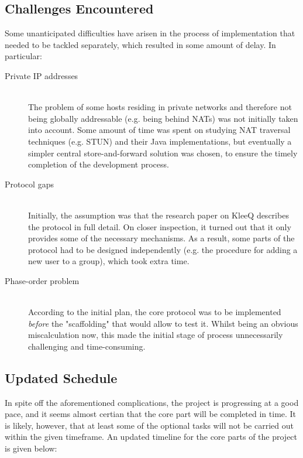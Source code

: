 \documentclass[12pt, a4paper]{article}
\begin{document}
\subsection{Challenges Encountered}
Some unanticipated difficulties have arisen in the process of implementation that needed to be tackled separately, which resulted in some amount of delay. In particular:
\begin{description}
    \item[Private IP addresses] \hfill \\
        The problem of some hosts residing in private networks and therefore not being globally addressable (e.g. being behind NATs) was not initially taken into account. Some amount of time was spent on studying NAT traversal techniques (e.g. STUN) and their Java implementations, but eventually a simpler central store-and-forward solution was chosen, to ensure the timely completion of the development process.
    \item[Protocol gaps] \hfill \\
        Initially, the assumption was that the research paper on KleeQ \cite{kleeq} describes the protocol in full detail. On closer inspection, it turned out that it only provides some of the necessary mechanisms. As a result, some parts of the protocol had to be designed independently (e.g. the procedure for adding a new user to a group), which took extra time.
    \item[Phase-order problem] \hfill \\
        According to the initial plan, the core protocol was to be implemented \emph{before} the "scaffolding" that would allow to test it. Whilst being an obvious miscalculation now, this made the initial stage of process unnecessarily challenging and time-consuming.
\end{description}


\subsection{Updated Schedule}
In spite off the aforementioned complications, the project is progressing at a good pace, and it seems almost certian that the core part will be completed in time. It is likely, however, that at least some of the optional tasks will not be carried out within the given timeframe. An updated timeline for the core parts of the project is given below:

\vspace{0.5cm}
\end{document}
